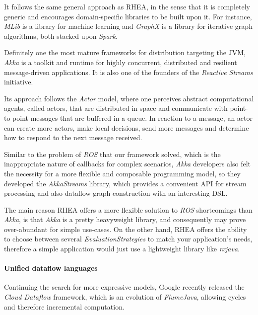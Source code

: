\documentclass[sigplan,review,anonymous]{acmart}
\begin{document}
It follows the same general approach as \textsc{RHEA}, in the sense that it is
completely generic and encourages domain-specific libraries to be built upon it.
For instance, \textit{MLib} is a library for machine learning and
\textit{GraphX} is a library for iterative graph algorithms, both stacked upon
\textit{Spark}.

Definitely one the most mature frameworks for distribution targeting the JVM,
\textit{Akka} is a toolkit and runtime for highly
concurrent, distributed and resilient message-driven applications. It is also
one of the founders of the \textit{Reactive Streams}\cite{rss} initiative.

Its approach follows the \textit{Actor} model\cite{actor}, where one perceives
abstract computational agents, called actors, that are distributed in space and
communicate with point-to-point messages that are buffered in a queue. In
reaction to a message, an actor can create more actors, make local decisions,
send more messages and determine how to respond to the next message received.

Similar to the problem of \textit{ROS} that our framework solved, which is the
inappropriate nature of callbacks for complex scenarios, \textit{Akka}
developers also felt the necessity for a more flexible and composable
programming model, so they developed the \textit{AkkaStreams} library, which
provides a convenient API for stream processing and also dataflow graph
construction with an interesting DSL.

The main reason \textsc{RHEA} offers a more flexible solution to \textit{ROS}
shortcomings than \textit{Akka}, is that \textit{Akka} is a pretty heavyweight
library, and consequently may prove over-abundant for simple use-cases. On the
other hand, \textsc{RHEA} offers the ability to choose between several
\textit{EvaluationStrategies} to match your application's needs, therefore a
simple application would just use a lightweight library like \textit{rxjava}.

\paragraph{Unified dataflow languages}

Continuing the search for more expressive models, Google recently released the
\textit{Cloud Dataflow} framework,
which is an evolution of \textit{FlumeJava}\cite{flumejava}, allowing cycles and
therefore incremental computation.
\end{document}
